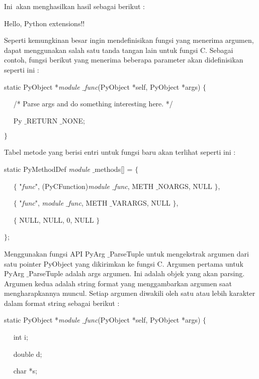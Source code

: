 \noindent 
Ini~akan menghasilkan hasil sebagai berikut  : \par
\noindent 
Hello, Python extensions!! \par
\vspace{12pt}
Seperti kemungkinan besar ingin mendefinisikan fungsi yang menerima argumen, dapat menggunakan salah satu tanda tangan lain untuk fungsi C. Sebagai contoh, fungsi berikut yang menerima beberapa parameter akan didefinisikan seperti ini : \par
\noindent 
static PyObject *\textit{module $  \_  $func}(PyObject *self, PyObject *args)  $  \{  $ \par
\noindent 
~~ /* Parse args and do something interesting here. */ \par
\noindent 
~~ Py $  \_  $RETURN $  \_  $NONE; \par
\noindent 
 $  \}  $ \par
\vspace{12pt}
Tabel metode yang berisi entri untuk fungsi baru akan terlihat seperti ini : \par
\noindent 
static PyMethodDef \textit{module} $  \_  $methods[] =  $  \{  $ \par
\noindent 
~~  $  \{  $ "\textit{func}", (PyCFunction)\textit{module $  \_  $func}, METH $  \_  $NOARGS, NULL  $  \}  $, \par
\noindent 
~~  $  \{  $ "\textit{func}", \textit{module $  \_  $func}, METH $  \_  $VARARGS, NULL  $  \}  $, \par
\noindent 
~~  $  \{  $ NULL, NULL, 0, NULL  $  \}  $ \par
\noindent 
 $  \}  $; \par
\vspace{12pt}
Menggunakan fungsi API PyArg $  \_  $ParseTuple untuk mengekstrak argumen dari satu pointer PyObject yang dikirimkan ke fungsi C. Argumen pertama untuk PyArg $  \_  $ParseTuple adalah args argumen. Ini adalah objek yang akan parsing. Argumen kedua adalah string format yang menggambarkan argumen saat mengharapkannya muncul. Setiap argumen diwakili oleh satu atau lebih karakter dalam format string sebagai berikut : \par
\noindent 
static PyObject *\textit{module $  \_  $func}(PyObject *self, PyObject *args)  $  \{  $ \par
\noindent 
~~ int i; \par
\noindent 
~~ double d; \par
\noindent 
~~ char *s; \par
\vspace{12pt}
